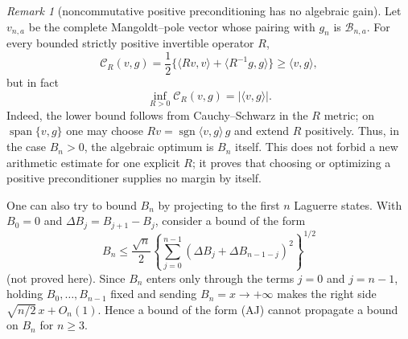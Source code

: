 \documentclass[11pt]{amsart}
\theoremstyle{definition}
\theoremstyle{remark}
\newtheorem{remark}[theorem]{Remark}
\theoremstyle{definition}
\begin{document}
\begin{remark}[noncommutative positive preconditioning has no algebraic gain]
\label{rmk:a1-noncommutative-preconditioner}
Let $v_{n,a}$ be the complete Mangoldt--pole vector whose pairing with
$g_n$ is $\mathcal B_{n,a}$.  For every bounded strictly positive
invertible operator $R$,
\[
 \mathcal C_R(v,g)=\frac12\{\langle Rv,v\rangle+
                         \langle R^{-1}g,g\rangle\}
 \ge \langle v,g\rangle,
\]
but in fact
\[
 \inf_{R>0}\mathcal C_R(v,g)=|\langle v,g\rangle|.         \tag{AI}
\]
Indeed, the lower bound follows from Cauchy--Schwarz in the $R$ metric;
on $\operatorname{span}\{v,g\}$ one may choose $Rv=\operatorname{sgn}
\langle v,g\rangle\,g$ and extend $R$ positively.  Thus, in the
case $B_n>0$, the algebraic optimum is $B_n$ itself.  This does not forbid
a new arithmetic estimate for one explicit $R$; it proves that choosing or
optimizing a positive preconditioner supplies no margin by itself.

One can also try to bound $B_n$ by projecting to the first $n$ Laguerre
states.  With $B_0=0$ and $\Delta B_j=B_{j+1}-B_j$, consider a bound of the
form
\[
 B_n\le\frac{\sqrt n}{2}
 \left\{\sum_{j=0}^{n-1}
 (\Delta B_j+\Delta B_{n-1-j})^2\right\}^{1/2}             \tag{AJ}
\]
(not proved here).  Since $B_n$ enters only through the terms $j=0$ and
$j=n-1$, holding $B_0,\ldots,B_{n-1}$ fixed and sending $B_n=x\to+\infty$
makes the right side $\sqrt{n/2}\,x+O_n(1)$.  Hence a bound of the form
(AJ) cannot propagate a bound on $B_n$ for $n\ge3$.
\end{remark}
\end{document}
